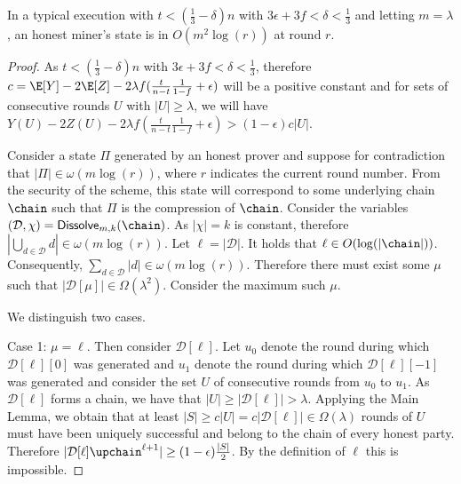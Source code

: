\begin{theorem}[Succinctness]
	In a typical execution with $t < (\frac{1}{3} - \delta)n$ with
	$3\epsilon + 3f < \delta < \frac{1}{3}$ and letting $m = \lambda$,
	an honest miner's state is in $O(m^2\log(r))$ at round $r$.
\end{theorem}
\begin{proof}
	As $t < (\frac{1}{3} - \delta)n$ with
	$3\epsilon + 3f < \delta < \frac{1}{3}$, therefore
	$c = \E[Y] - 2\E[Z] - 2\lambda f(\frac{t}{n-t}\frac{1}{1-f} + \epsilon)$ will be
	a positive constant and for sets of consecutive rounds $U$ with
	$|U| \geq \lambda$,
	we will have
	$Y(U) - 2Z(U) - 2\lambda f(\frac{t}{n-t}\frac{1}{1-f} + \epsilon) > (1 - \epsilon)c|U|$.

	Consider a state $\Pi$ generated by an honest prover and suppose for
	contradiction that $|\Pi| \in \omega(m\log(r))$, where $r$ indicates the
	current round number. From the security of the
	scheme, this state will correspond to some underlying chain $\chain$ such that
	$\Pi$ is the compression of $\chain$. Consider the variables
	$(\mathcal{D}, \chi) = \textsf{Dissolve}_{m,k}(\chain)$. As $|\chi| = k$ is
	constant, therefore $|\bigcup_{d \in \mathcal{D}} d| \in \omega(m\log(r))$.
  Let $\ell = |\mathcal{D}|$.	It holds that $\ell \in O(\log(|\chain|))$.
  Consequently, $\sum_{d \in \mathcal{D}} |d| \in \omega(m\log(r))$. Therefore
  there must exist some $\mu$ such that $|\mathcal{D}[\mu]| \in \Omega(\lambda^2)$.
	Consider the maximum such $\mu$.

	We distinguish two cases.

	Case 1: $\mu = \ell$. Then consider $\mathcal{D}[\ell]$.
	Let $u_0$ denote the round during which $\mathcal{D}[\ell][0]$ was generated
	and $u_1$ denote the round during which $\mathcal{D}[\ell][-1]$ was generated
	and consider the set $U$ of consecutive rounds from $u_0$ to $u_1$. As
	$\mathcal{D}[\ell]$ forms a chain, we have that
	$|U| \geq |\mathcal{D}[\ell]| > \lambda$. Applying the Main Lemma, we obtain
	that at least $|S| \geq c|U| = c|\mathcal{D}[\ell]| \in \Omega(\lambda)$
	rounds of $U$ must have been uniquely successful and belong to the chain of
	every honest party. Therefore $|\mathcal{D}[\ell]\upchain^{\ell+1}| \geq (1 - \epsilon)\frac{|S|}{2}$. By the definition of $\ell$ this is impossible.


\end{proof}
